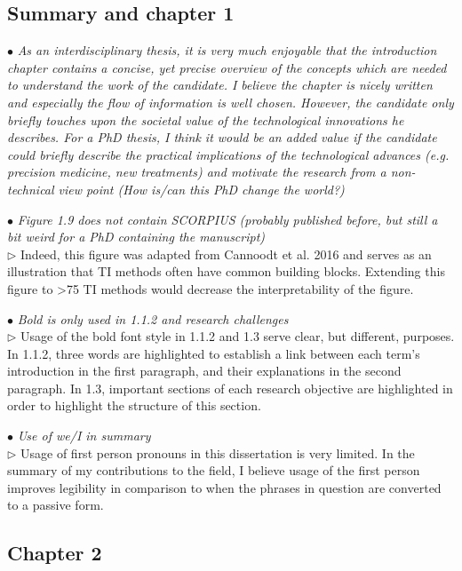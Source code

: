 \documentclass[10pt]{article}
\newcommand{\exam}[2][\  ]{\hspace{0pt}\marginpar{\color{red}#1}$\bullet$ \textit{#2}}
\newcommand{\imp}[1]{{\color{red} #1}}
\newcommand{\nimp}[1]{{\color{gray} #1}}
\newcommand{\answ}[1]{{\color{blue} $\triangleright$ #1}}
\newcommand{\bigexclaim}{\raisebox{-0.1em}{\BigTriangleUp}\hspace{-0.32em}\llap{\small\textbf{!}}\hspace{0.32em}}
\newcommand{\tagimp}{\bigexclaim}
\newcommand{\tagtime}{{\Large $\hourglass$}}
\begin{document}
{\subsection{Summary and chapter 1}

\exam[\tagimp \tagtime]{\nimp{As an interdisciplinary thesis, it is very much enjoyable that the introduction
	chapter contains a concise, yet precise overview of the concepts which are
	needed to understand the work of the candidate. I believe the chapter is nicely
	written and especially the flow of information is well chosen. However, the
	candidate only briefly touches upon the societal value of the technological
	innovations he describes. For a PhD thesis, } \imp{I think it would be an added value
	if the candidate could briefly describe the practical implications of the
	technological advances (e.g. precision medicine, new treatments) and
	motivate the research from a non-technical view point (How is/can this PhD
	change the world?)}}



\exam{Figure 1.9 does not contain SCORPIUS (probably published before,
	but still a bit weird for a PhD containing the manuscript)} \\
\answ{Indeed, this figure was adapted from Cannoodt et al. 2016 and serves as an illustration that
TI methods often have common building blocks. Extending this figure to >75 TI methods would decrease the interpretability of the figure.}

\exam{Bold is only used in 1.1.2 and research challenges} \\
\answ{Usage of the bold font style in 1.1.2 and 1.3 serve clear, but different, purposes. In 1.1.2, three words are highlighted to establish a link between each term's introduction in the first paragraph, and their explanations in the second paragraph. In 1.3, important sections of each research objective are highlighted in order to highlight the structure of this section.}

\exam{Use of we/I in summary} \\
\answ{Usage of first person pronouns in this dissertation is very limited. In the summary of my contributions to the field, I believe usage of the first person improves legibility in comparison to when the phrases in question are converted to a passive form.}



\subsection{Chapter 2}

}
\end{document}
